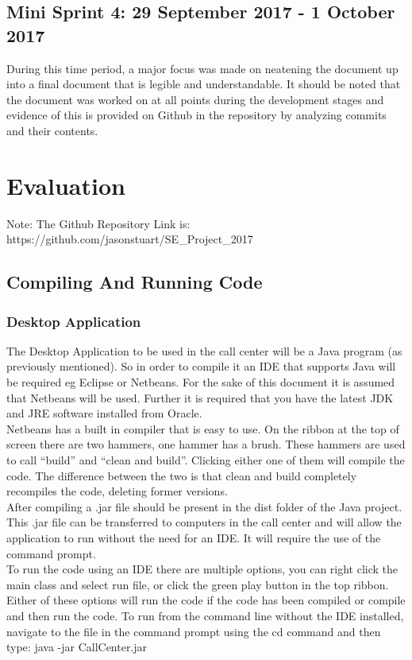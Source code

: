 \documentclass[a4paper,12pt]{article}
\begin{document}
\subsection{Mini Sprint 4: 29 September 2017 - 1 October 2017}
During this time period, a major focus was made on neatening the document up into a final document that is legible and understandable. It should be noted that the document was worked on at all points during the development stages and evidence of this is provided on Github in the repository by analyzing commits and their contents.

\newpage
\section{Evaluation}
Note: The Github Repository Link is: https://github.com/jasonstuart/SE\_Project\_2017
\subsection{Compiling And Running Code}
\subsubsection{Desktop Application}
The Desktop Application to be used in the call center will be a Java program (as previously mentioned). So in order to compile it an IDE that supports Java will be required eg Eclipse or Netbeans. For the sake of this document it is assumed that Netbeans will be used. Further it is required that you have the latest JDK and JRE software installed from Oracle.\\
Netbeans has a built in compiler that is easy to use. On the ribbon at the top of screen there are two hammers, one hammer has a brush. These hammers are used to call ``build'' and ``clean and build''. Clicking either one of them will compile the code. The difference between the two is that clean and build completely recompiles the code, deleting former versions.\\
After compiling a .jar file should be present in the dist folder of the Java project. This .jar  file can be transferred to computers in the call center and will allow the application to run without the need for an IDE. It will require the use of the command prompt.\\To run the code using an IDE there are multiple options, you can right click the main class and select run file, or click the green play button in the top ribbon. Either of these options will run the code if the code has been compiled or compile and then run the code. To run from the command line without the IDE installed, navigate to the file in the command prompt using the cd command and then type: java -jar CallCenter.jar
\newpage
\end{document}
